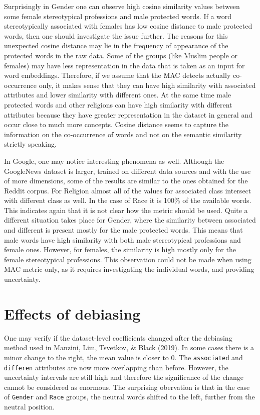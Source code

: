 \documentclass[
  10pt,
  dvipsnames,enabledeprecatedfontcommands]{scrartcl}
\begin{document}
Surprisingly in Gender one can observe high cosine similarity values
between some female stereotypical professions and male protected words.
If a word stereotypically associated with females has low cosine
distance to male protected words, then one should investigate the issue
further. The reasons for this unexpected cosine distance may lie in the
frequency of appearance of the protected words in the raw data. Some of
the groups (like Muslim people or females) may have less representation
in the data that is taken as an input for word embeddings. Therefore, if
we assume that the MAC detects actually co-occurrence only, it makes
sense that they can have high similarity with associated attributes and
lower similarity with different ones. At the same time male protected
words and other religions can have high similarity with different
attributes because they have greater representation in the dataset in
general and occur close to much more concepts. Cosine distance seems to
capture the information on the co-occurrence of words and not on the
semantic similarity strictly speaking.

In Google, one may notice interesting phenomena as well. Although the
GoogleNews dataset is larger, trained on different data sources and with
the use of more dimensions, some of the results are similar to the ones
obtained for the Reddit corpus. For Religion almost all of the values
for associated class intersect with different class as well. In the case
of Race it is 100\% of the available words. This indicates again that it
is not clear how the metric should be used. Quite a different situation
takes place for Gender, where the similarity between associated and
different is present mostly for the male protected words. This means
that male words have high similarity with both male stereotypical
professions and female ones. However, for females, the similarity is
high mostly only for the female stereotypical professions. This
observation could not be made when using MAC metric only, as it requires
investigating the individual words, and providing uncertainty.

\hypertarget{effects-of-debiasing}{%
\section{Effects of debiasing}\label{effects-of-debiasing}}

One may verify if the dataset-level coefficients changed after the
debiasing method used in Manzini, Lim, Tsvetkov, \& Black (2019). In
some cases there is a minor change to the right, the mean value is
closer to 0. The \texttt{associated} and \texttt{differen} attributes
are now more overlapping than before. However, the uncertainty intervals
are still high and therefore the significance of the change cannot be
considered as enormous. The surprising obervation is that in the case of
\texttt{Gender} and \texttt{Race} groups, the neutral words shifted to
the left, further from the neutral position.
\end{document}
